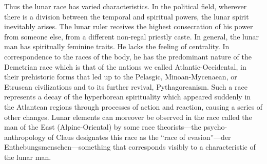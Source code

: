 Thus the lunar race has varied characteristics. In the political field, wherever there is a division between the temporal and spiritual powers, the lunar spirit inevitably arises. The lunar ruler receives the highest consecration of his power from someone else, from a different non-regal priestly caste. In general, the lunar man has spiritually feminine traits. He lacks the feeling of centrality. In correspondence to the races of the body, he has the predominant nature of the Demetrian race which is that of the nations we called Atlantic-Occidental, in their prehistoric forms that led up to the Pelasgic, Minoan-Mycenaean, or Etruscan civilizations and to its further revival, Pythagoreanism. Such a race represents a decay of the hyperborean spirituality which appeared suddenly in the Atlantean regions through processes of action and reaction, causing a series of other changes. Lunar elements can moreover be observed in the race called the man of the East (Alpine-Oriental) by some race theorists---the psycho-anthropology of Claus designates this race as the ``race of evasion''---der Enthebungsmenschen---something that corresponds visibly to a characteristic of the lunar man.



